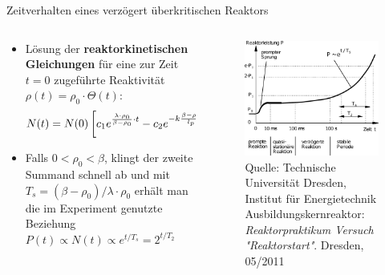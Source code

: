 \documentclass[10pt]{beamer}
\begin{document}
		\begin{frame}{Zeitverhalten eines verzögert überkritischen Reaktors}
				\begin{columns}
						\begin{column}[c]{0.6\linewidth}
							\begin{itemize}
								\item Lösung der \textbf{reaktorkinetischen Gleichungen} für eine zur Zeit $t=0$ zugeführte Reaktivität $\rho(t) = \rho_0\cdot \Theta(t)$:
								\begin{equation*}
								 \footnotesize{
									N(t)= N(0) \left[ c_1 e^{\frac{\lambda \cdot \rho_0}{\beta - \rho_0}\cdot t} - c_2 e^{-k\frac{\beta - \rho_0}{l_p} \cdot t} \right]
									}
								\end{equation*}
								\item Falls $0 < \rho_0 < \beta$, klingt der zweite Summand schnell ab und mit $T_s = (\beta - \rho_0)/\lambda\cdot \rho_0$ erhält man die im Experiment genutzte Beziehung $P(t) \propto N(t)\propto e^{t/T_s} = 2^{t/T_2}$
							\end{itemize}
						\end{column}
									
						\begin{column}[c]{0.4\linewidth}
							\begin{figure}[ht]
								\centering
								\includegraphics[width=\textwidth]{pic/Leistungsaenderung.pdf}\\
								\tiny{Quelle: Technische Universität Dresden,  Institut für Energietechnik Ausbildungskernreaktor: \textit{Reaktorpraktikum Versuch "Reaktorstart"}. Dresden, 05/2011}
							\end{figure}
						\end{column}
	     		\end{columns}	
		\end{frame}
		
\end{document}
